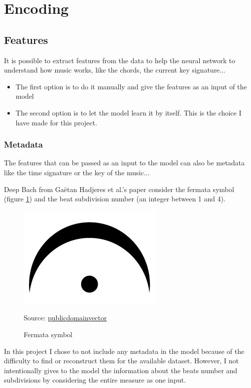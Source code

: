 \documentclass[12pt]{report}
\begin{document}

\section{Encoding}

\subsection{Features}

It is possible to extract features from the data to help the neural network to understand how music works, like the chords, the current key signature...
\begin{itemize}
    \item The first option is to do it manually and give the features as an input of the model
    \item The second option is to let the model learn it by itself. This is the choice I have made for this project.
\end{itemize}

\subsubsection{Metadata}

The features that can be passed as an input to the model can also be metadata like the time signature or the key of the music...

Deep Bach from Gaëtan Hadjeres et al.'s paper \cite{hadjeres_deepbach:_2016} consider the fermata symbol (figure \ref{fig:fermata}) and the beat subdivision number (an integer between 1 and 4).

\begin{figure}[htbp]
     \centering
     \includegraphics[width=.1\linewidth]{images/music/symbols/fermata.png}
     \caption{Fermata symbol}
     Source: \href{https://publicdomainvectors.org/en/free-clipart/Music-symbol/70183.html}{publicdomainvector}
     \label{fig:fermata}
\end{figure}

In this project I chose to not include any metadata in the model because of the difficulty to find or reconstruct them for the available dataset.
However, I not intentionally gives to the model the information about the beats number and subdivisions by considering the entire measure as one input.
\end{document}
